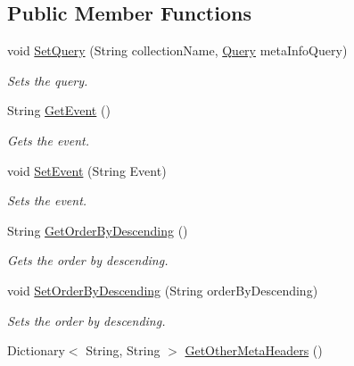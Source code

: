 \subsection*{Public Member Functions}
\begin{DoxyCompactItemize}
\item 
void \hyperlink{classcom_1_1shephertz_1_1app42_1_1paas_1_1sdk_1_1csharp_1_1_app42_service_aaee243a1a89a5000f84dfb636534191e}{Set\+Query} (String collection\+Name, \hyperlink{classcom_1_1shephertz_1_1app42_1_1paas_1_1sdk_1_1csharp_1_1storage_1_1_query}{Query} meta\+Info\+Query)
\begin{DoxyCompactList}\small\item\em Sets the query. \end{DoxyCompactList}\item 
String \hyperlink{classcom_1_1shephertz_1_1app42_1_1paas_1_1sdk_1_1csharp_1_1_app42_service_a0bcc0a7d61995c5f76aadda952c169a5}{Get\+Event} ()
\begin{DoxyCompactList}\small\item\em Gets the event. \end{DoxyCompactList}\item 
void \hyperlink{classcom_1_1shephertz_1_1app42_1_1paas_1_1sdk_1_1csharp_1_1_app42_service_a5b408ff2e041e8f399072ec4dc2de77d}{Set\+Event} (String Event)
\begin{DoxyCompactList}\small\item\em Sets the event. \end{DoxyCompactList}\item 
String \hyperlink{classcom_1_1shephertz_1_1app42_1_1paas_1_1sdk_1_1csharp_1_1_app42_service_a0bfc688a598853ca6c5d2bb25f54afff}{Get\+Order\+By\+Descending} ()
\begin{DoxyCompactList}\small\item\em Gets the order by descending. \end{DoxyCompactList}\item 
void \hyperlink{classcom_1_1shephertz_1_1app42_1_1paas_1_1sdk_1_1csharp_1_1_app42_service_a2a37922e42f68072ea598ed30b8221c0}{Set\+Order\+By\+Descending} (String order\+By\+Descending)
\begin{DoxyCompactList}\small\item\em Sets the order by descending. \end{DoxyCompactList}\item 
Dictionary$<$ String, String $>$ \hyperlink{classcom_1_1shephertz_1_1app42_1_1paas_1_1sdk_1_1csharp_1_1_app42_service_add1b87766546516fa806e78e249dbfb8}{Get\+Other\+Meta\+Headers} ()

\end{DoxyCompactItemize}
